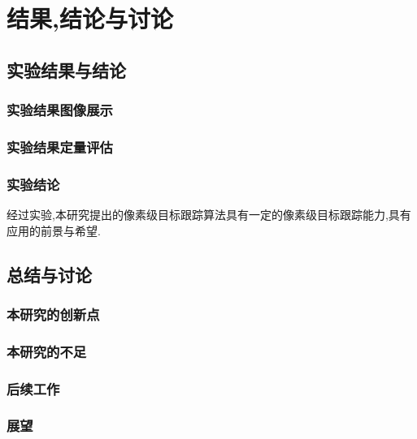 
\chapter{结果,结论与讨论}
\section{实验结果与结论}
\subsection{实验结果图像展示}
\subsection{实验结果定量评估}
\subsection{实验结论}
经过实验,本研究提出的像素级目标跟踪算法具有一定的像素级目标跟踪能力,具有应用的前景与希望.

\section{总结与讨论}
\subsection{本研究的创新点}
\subsection{本研究的不足}
\subsection{后续工作}
\subsection{展望}

